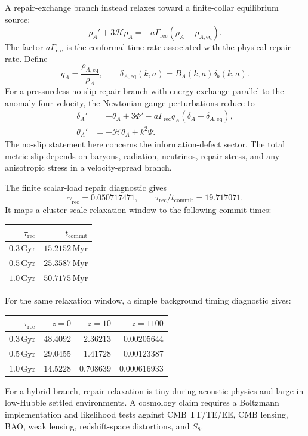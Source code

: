 \documentclass[11pt]{article}
\begin{document}
A repair-exchange branch instead relaxes toward a finite-collar equilibrium
source:
\begin{equation}
  \rho_A' + 3\mathcal H\rho_A
  = -a\Gamma_{\mathrm{rec}}(\rho_A-\rho_{A,\mathrm{eq}}).
  \label{eq:repairbackground}
\end{equation}
The factor \(a\Gamma_{\mathrm{rec}}\) is the conformal-time rate associated
with the physical repair rate.  Define
\begin{equation}
  q_A=\frac{\rho_{A,\mathrm{eq}}}{\rho_A},
  \qquad
  \delta_{A,\mathrm{eq}}(k,a)=B_A(k,a)\delta_b(k,a).
\end{equation}
For a pressureless no-slip repair branch with energy exchange parallel to
the anomaly four-velocity, the Newtonian-gauge perturbations reduce to
\begin{align}
  \delta_A'
    &=-\theta_A+3\Phi'
      -a\Gamma_{\mathrm{rec}}q_A
       (\delta_A-\delta_{A,\mathrm{eq}}),
       \label{eq:deltaA}\\
  \theta_A'
    &=-\mathcal H\theta_A+k^2\Psi.
       \label{eq:thetaA}
\end{align}
The no-slip statement here concerns the information-defect sector.  The total
metric slip depends on baryons, radiation, neutrinos, repair stress, and any
anisotropic stress in a velocity-spread branch.

The finite scalar-load repair diagnostic gives
\[
  \gamma_{\mathrm{rec}}=0.050717471,
  \qquad
  \tau_{\mathrm{rec}}/t_{\mathrm{commit}}=19.717071 .
\]
It maps a cluster-scale relaxation window to the following commit times:
\begin{center}
\begin{tabular}{@{}rr@{}}
\toprule
\(\tau_{\mathrm{rec}}\) & \(t_{\mathrm{commit}}\) \\
\midrule
\(0.3\,\mathrm{Gyr}\) & \(15.2152\,\mathrm{Myr}\) \\
\(0.5\,\mathrm{Gyr}\) & \(25.3587\,\mathrm{Myr}\) \\
\(1.0\,\mathrm{Gyr}\) & \(50.7175\,\mathrm{Myr}\) \\
\bottomrule
\end{tabular}
\end{center}
For the same relaxation window, a simple background timing diagnostic gives:
\begin{center}
\begin{tabular}{@{}rrrr@{}}
\toprule
\(\tau_{\mathrm{rec}}\) & \(z=0\) & \(z=10\) & \(z=1100\) \\
\midrule
\(0.3\,\mathrm{Gyr}\) & \(48.4092\) & \(2.36213\) & \(0.00205644\) \\
\(0.5\,\mathrm{Gyr}\) & \(29.0455\) & \(1.41728\) & \(0.00123387\) \\
\(1.0\,\mathrm{Gyr}\) & \(14.5228\) & \(0.708639\) & \(0.000616933\) \\
\bottomrule
\end{tabular}
\end{center}
For a hybrid branch, repair relaxation is tiny during acoustic physics and
large in low-Hubble settled environments.  A cosmology claim requires a
Boltzmann implementation and likelihood tests against CMB TT/TE/EE, CMB
lensing, BAO, weak lensing, redshift-space distortions, and \(S_8\).
\end{document}

